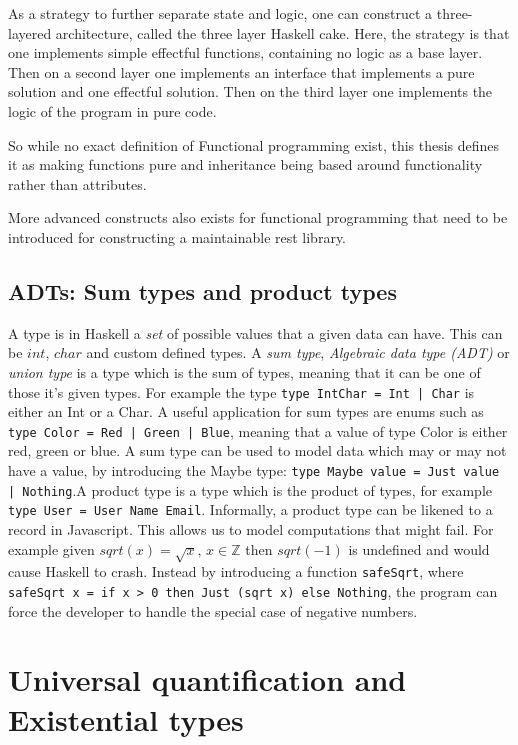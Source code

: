 \begin{description}
As a strategy to further separate state and logic, one can construct a
        three-layered architecture, called the three layer Haskell cake. Here,
        the strategy is that one implements simple effectful functions,
        containing no logic as a base layer. Then on a second layer one
        implements an interface that implements a pure solution and one
        effectful solution. Then on the third layer one implements the logic of
        the program in pure code.  
\end{description}

So while no exact definition of Functional programming exist, this thesis
defines it as making functions pure and inheritance being based around
functionality rather than attributes. 

More advanced constructs also exists for functional programming that need to be
introduced for constructing a maintainable rest library. 

\subsection{ADTs: Sum types and product types}\label{types}

A type is in Haskell a \textit{set} of possible values that a given data can
have. This can be $int$, $char$ and custom defined types. A \textit{sum type},
\textit{Algebraic data type (ADT)} or \textit{union type} is a type which is the
sum of types, meaning that it can be one of those it's given types. For example
the type \texttt{type IntChar = Int | Char} is either an Int or a Char. A useful
application for sum types are enums such as \texttt{type Color = Red | Green |
Blue}, meaning that a value of type Color is either red, green or blue. A sum
type can be used to model data which may or may not have a value, by introducing
the Maybe type: \texttt{type Maybe value = Just value | Nothing}.A product type
is a type which is the product of types, for example \texttt{type User = User
Name Email}.  Informally, a product type can be likened to a record in
Javascript.  This allows us to model computations that might fail. For example
given $sqrt(x) = \sqrt{x},\, x\in \mathbb{Z}$ then $sqrt(-1)$ is undefined and
would cause Haskell to crash.  Instead by introducing a function
\texttt{safeSqrt}, where \texttt{safeSqrt x = if x > 0 then Just (sqrt x) else
Nothing}, the program can force the developer to handle the special case of
negative numbers. 


\section{Universal quantification and Existential types}

